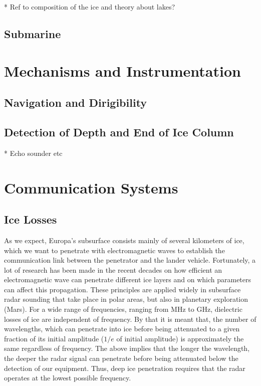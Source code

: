 {{* Ref to composition of the ice and theory about lakes?

\subsection{Submarine}

\section{Mechanisms and Instrumentation}

\subsection{Navigation and Dirigibility}

\subsection{Detection of Depth and End of Ice Column}

* Echo sounder etc

\section{Communication Systems}

\subsection{Ice Losses}
As we expect, Europa's subsurface consists mainly of several kilometers of ice, which we want to penetrate with electromagnetic waves to establish the communication link between the penetrator and the lander vehicle. Fortunately, a lot of research has been made in the recent decades on how efficient an electromagnetic wave can penetrate different ice layers and on which parameters can affect this propagation. These principles are applied widely in subsurface radar sounding that take place in polar areas, but also in planetary exploration (Mars). For a wide range of frequencies, ranging from MHz to GHz, dielectric losses of ice are independent of frequency. By that it is meant that, the number of wavelengths, which can penetrate into ice before being attenuated to a given fraction of its initial amplitude ($1/e$ of initial amplitude) is approximately the same regardless of frequency. The above implies that the longer the wavelength, the deeper the radar signal can penetrate before being attenuated below the detection of our equipment. Thus, deep ice penetration requires that the radar operates at the lowest possible frequency. 

}}
